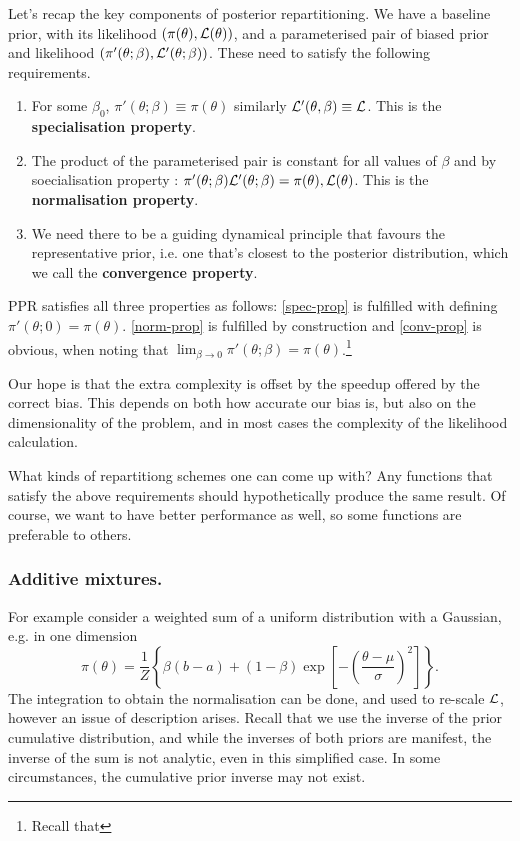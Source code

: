 \documentclass[usenatbib]{mnras}
\begin{document}
Let's recap the key components of posterior repartitioning. We have
   a baseline prior, with its likelihood \((\pi(\theta), \cal L
      (\theta))\), and a parameterised pair of biased prior and
   likelihood \((\pi'(\theta; \beta), \cal L' (\theta;
      \beta))\). These need to satisfy the following requirements.

\begin{enumerate}
\item For some \(\beta_{0}\), \(\pi'(\theta; \beta) \equiv \pi(\theta)\)
similarly \({\cal L'(\theta, \beta) \equiv {\cal L}}\). This is
the \textbf{\textbf{specialisation property}}.\label{spec-prop}
\item The product of the parameterised pair is constant for all values
of \(\beta\) and by soecialisation property : \(\pi'(\theta; \beta)
      \cal L' (\theta; \beta) = \pi(\theta), \cal L (\theta)\). This is
the \textbf{\textbf{normalisation property}}.\label{norm-prop}
\item We need there to be a guiding dynamical principle that favours
the representative prior, i.e. one that's closest to the
posterior distribution, which we call the \textbf{\textbf{convergence
property}}.\label{conv-prop}
\end{enumerate}

PPR satisfies all three properties as follows: \autoref{spec-prop} is
fulfilled with defining \(\pi'(\theta; 0) =
   \pi(\theta)\). \autoref{norm-prop} is fulfilled by construction and
\autoref{conv-prop} is obvious, when noting that \(\lim_{\beta
   \rightarrow 0} \pi'(\theta; \beta) = \pi(\theta)\).\footnote{Recall that }

Our hope is that the extra complexity is offset by the speedup
offered by the correct bias. This depends on both how accurate our
bias is, but also on the dimensionality of the problem, and in most
cases the complexity of the likelihood calculation. 

What kinds of repartitiong schemes one can come up with? Any
functions that satisfy the above requirements should hypothetically
produce the same result. Of course, we want to have better
performance as well, so some functions are preferable to others. 

\subsubsection{Additive mixtures.}
\label{sec:org752b57b}
For example consider a weighted sum of a uniform distribution with
a Gaussian, e.g. in one dimension
\begin{equation}
  \pi(\theta) = \frac{1}{Z} \left\lbrace \beta (b - a) + (1-\beta) \exp \left[ -\left(\frac{\theta - \mu}{\sigma} \right)^{2}\right]\right\rbrace.
\end{equation}
The integration to obtain the normalisation can be done, and used
to re-scale \({\cal L}\), however an issue of description
arises. Recall that we use the inverse of the prior cumulative
distribution, and while the inverses of both priors are manifest,
the inverse of the sum is not analytic, even in this simplified
case. In some circumstances, the cumulative prior inverse may not
exist. 
\end{document}
